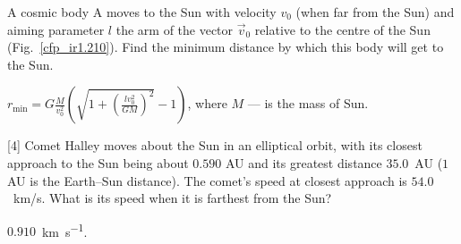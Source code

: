 \begin{problem}\label{prb:cfp_ir1.210}
	A cosmic body A moves to the Sun with velocity $v_0$ (when 
	far from the Sun) and aiming parameter $l$ the arm of the vector $\vec v_0$ 
	relative to the centre of the Sun (Fig.~\ref{cfp_ir1.210}). Find the minimum  
	distance by which this body will get to the Sun. 
	\begin{solution}
		$r_{\min} = G\frac{M}{v_0^2}\left( \sqrt{1+ \left(\frac{lv_0^2}{GM}\right)^2 } - 1\right) $, where $M$ --- is the mass of Sun.
	\end{solution}
\end{problem}

\begin{problem}
	Comet Halley moves about the Sun in an elliptical orbit, with its closest approach to the Sun being about $0.590$ AU and its greatest distance $35.0$~AU ($1$ AU is the Earth–Sun distance). The comet’s speed at closest approach is $54.0$~km/s. What is its speed when it is farthest from the Sun?
	\begin{solution}
		$0.910$~\si{\kilo\meter\per\second}.
	\end{solution}
\end{problem}





